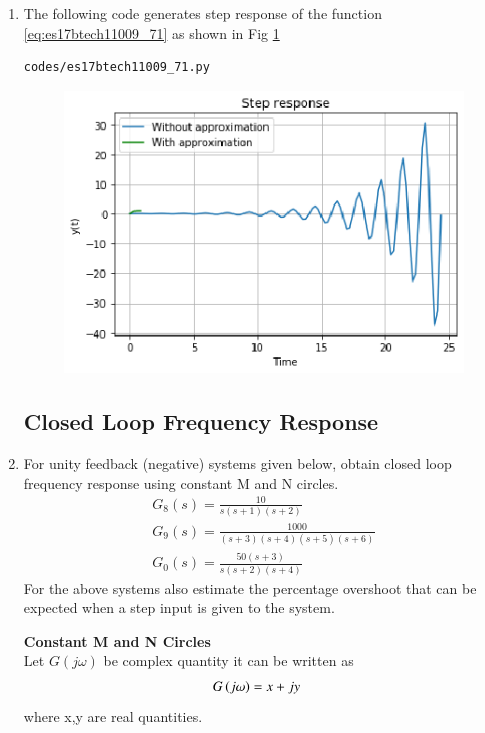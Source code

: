 \begin{enumerate}[label=\thesection.\arabic*.,ref=\thesection.\theenumi]
 \item
The following code generates step response of the function \eqref{eq:es17btech11009_71} as shown in Fig \ref{fig:es17btech11009_fig71}
\begin{lstlisting}
codes/es17btech11009_71.py
\end{lstlisting}
\begin{figure}[!h]
\centering
\includegraphics[width=\columnwidth]{./figs/es17btech11009_71.eps}
\caption{}
\label{fig:es17btech11009_fig71}
\end{figure}
  
\subsection{Closed Loop Frequency Response }
\item
For unity feedback (negative) systems given below, obtain closed loop frequency response using constant M and N circles.
\begin{align}
G_8(s)= \frac{10}{s(s+1)(s+2)}
 \label{eq:es17btech11009_o}
 \\
G_9(s)= \frac{1000}{(s+3)(s+4)(s+5)(s+6)}
\label{eq:es17btech11009_p}
\\
G_0(s)= \frac{50(s+3)}{s(s+2)(s+4)}
\label{eq:es17btech11009_q}
\end{align}
For the above systems also estimate the percentage overshoot that can be expected when a step input is given to the system.

\textbf{Constant M and N Circles}
\\
Let $G(j\omega)$ be complex quantity it can be written as 
\begin{align}
G\brak{j \omega} &= x+j y
\label{eq:es17btech11009_comp}
\end{align}
where x,y are real quantities.


\end{enumerate}
